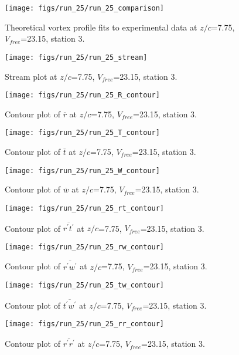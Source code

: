 \begin{figure}[H]
\centering
\texttt{[image: figs/run\_25/run\_25\_comparison]}
\caption{Theoretical vortex profile fits to experimental data at $z/c$=7.75, $V_{free}$=23.15, station 3.}
\end{figure}


\begin{figure}[H]
\centering
\texttt{[image: figs/run\_25/run\_25\_stream]}
\caption{Stream plot at $z/c$=7.75, $V_{free}$=23.15, station 3.}
\end{figure}


\begin{figure}[H]
\centering
\texttt{[image: figs/run\_25/run\_25\_R\_contour]}
\caption{Contour plot of $\overline{r}$ at $z/c$=7.75, $V_{free}$=23.15, station 3.}
\end{figure}


\begin{figure}[H]
\centering
\texttt{[image: figs/run\_25/run\_25\_T\_contour]}
\caption{Contour plot of $\overline{t}$ at $z/c$=7.75, $V_{free}$=23.15, station 3.}
\end{figure}


\begin{figure}[H]
\centering
\texttt{[image: figs/run\_25/run\_25\_W\_contour]}
\caption{Contour plot of $\overline{w}$ at $z/c$=7.75, $V_{free}$=23.15, station 3.}
\end{figure}


\begin{figure}[H]
\centering
\texttt{[image: figs/run\_25/run\_25\_rt\_contour]}
\caption{Contour plot of $\overline{r^\prime t^\prime}$ at $z/c$=7.75, $V_{free}$=23.15, station 3.}
\end{figure}


\begin{figure}[H]
\centering
\texttt{[image: figs/run\_25/run\_25\_rw\_contour]}
\caption{Contour plot of $\overline{r^\prime w^\prime}$ at $z/c$=7.75, $V_{free}$=23.15, station 3.}
\end{figure}


\begin{figure}[H]
\centering
\texttt{[image: figs/run\_25/run\_25\_tw\_contour]}
\caption{Contour plot of $\overline{t^\prime w^\prime}$ at $z/c$=7.75, $V_{free}$=23.15, station 3.}
\end{figure}


\begin{figure}[H]
\centering
\texttt{[image: figs/run\_25/run\_25\_rr\_contour]}
\caption{Contour plot of $\overline{r^\prime r^\prime}$ at $z/c$=7.75, $V_{free}$=23.15, station 3.}
\end{figure}


